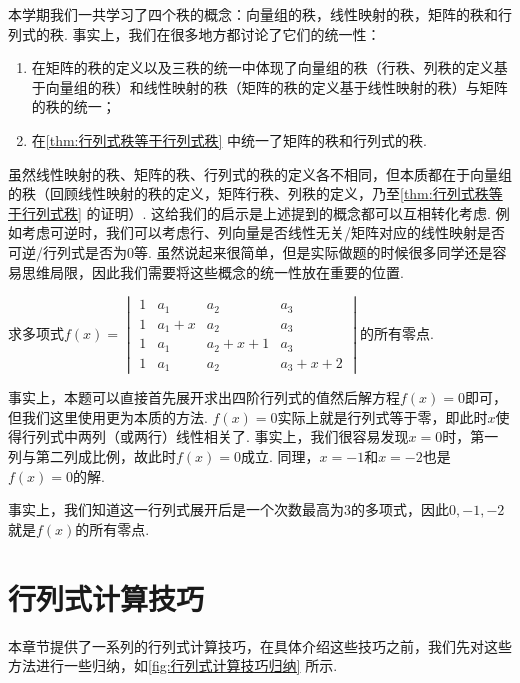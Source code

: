 本学期我们一共学习了四个秩的概念：向量组的秩，线性映射的秩，矩阵的秩和行列式的秩. 事实上，我们在很多地方都讨论了它们的统一性：
\begin{enumerate}
    \item 在矩阵的秩的定义以及三秩的统一中体现了向量组的秩（行秩、列秩的定义基于向量组的秩）和线性映射的秩（矩阵的秩的定义基于线性映射的秩）与矩阵的秩的统一；

    \item 在\autoref{thm:行列式秩等于行列式秩} 中统一了矩阵的秩和行列式的秩.
\end{enumerate}
虽然线性映射的秩、矩阵的秩、行列式的秩的定义各不相同，但本质都在于向量组的秩（回顾线性映射的秩的定义，矩阵行秩、列秩的定义，乃至\autoref{thm:行列式秩等于行列式秩} 的证明）. 这给我们的启示是上述提到的概念都可以互相转化考虑. 例如考虑可逆时，我们可以考虑行、列向量是否线性无关/矩阵对应的线性映射是否可逆/行列式是否为0等. 虽然说起来很简单，但是实际做题的时候很多同学还是容易思维局限，因此我们需要将这些概念的统一性放在重要的位置.
\begin{example}{}{}
    求多项式$f(x)=\begin{vmatrix}
            1 & a_1   & a_2     & a_3     \\
            1 & a_1+x & a_2     & a_3     \\
            1 & a_1   & a_2+x+1 & a_3     \\
            1 & a_1   & a_2     & a_3+x+2
        \end{vmatrix}$的所有零点.
\end{example}

\begin{solution}
    事实上，本题可以直接首先展开求出四阶行列式的值然后解方程$f(x)=0$即可，但我们这里使用更为本质的方法. $f(x)=0$实际上就是行列式等于零，即此时$x$使得行列式中两列（或两行）线性相关了. 事实上，我们很容易发现$x=0$时，第一列与第二列成比例，故此时$f(x)=0$成立. 同理，$x=-1$和$x=-2$也是$f(x)=0$的解.

    事实上，我们知道这一行列式展开后是一个次数最高为3的多项式，因此$0,-1,-2$就是$f(x)$的所有零点.
\end{solution}


\section{行列式计算技巧}

本章节提供了一系列的行列式计算技巧，在具体介绍这些技巧之前，我们先对这些方法进行一些归纳，如\autoref{fig:行列式计算技巧归纳} 所示.

